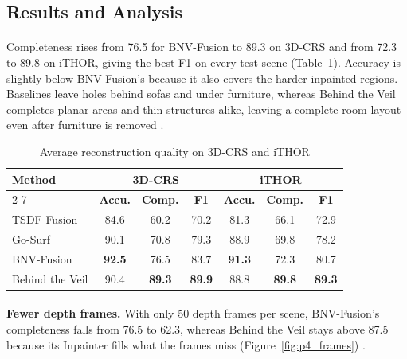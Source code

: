 \documentclass[12pt,a4paper,final]{extreport}
\begin{document}
\subsection{Results and Analysis}

\paragraph{} Completeness rises from 76.5 for BNV-Fusion to 89.3 on 3D-CRS and from 72.3 to 89.8 on iTHOR, giving the best F1 on every test scene (Table~\ref{tab:p4_main}). Accuracy is slightly below BNV-Fusion's because it also covers the harder inpainted regions. Baselines leave holes behind sofas and under furniture, whereas Behind the Veil completes planar areas and thin structures alike, leaving a complete room layout even after furniture is removed \cite{p4}.

{\renewcommand{\arraystretch}{1.12}
\begin{table}[htbp]
\centering
\caption{Average reconstruction quality on 3D-CRS and iTHOR}\label{tab:p4_main}
\small
\begin{tabular}{|l|c|c|c|c|c|c|}
\hline
\multirow{2}{*}{\textbf{Method}} & \multicolumn{3}{c|}{\textbf{3D-CRS}} & \multicolumn{3}{c|}{\textbf{iTHOR}} \\ \cline{2-7}
 & \textbf{Accu.} & \textbf{Comp.} & \textbf{F1} & \textbf{Accu.} & \textbf{Comp.} & \textbf{F1} \\ \hline
TSDF Fusion & 84.6 & 60.2 & 70.2 & 81.3 & 66.1 & 72.9 \\ \hline
Go-Surf & 90.1 & 70.8 & 79.3 & 88.9 & 69.8 & 78.2 \\ \hline
BNV-Fusion & \textbf{92.5} & 76.5 & 83.7 & \textbf{91.3} & 72.3 & 80.7 \\ \hline
Behind the Veil & 90.4 & \textbf{89.3} & \textbf{89.9} & 88.8 & \textbf{89.8} & \textbf{89.3} \\ \hline
\end{tabular}
\end{table}}

\paragraph{} \textbf{Fewer depth frames.} With only 50 depth frames per scene, BNV-Fusion's completeness falls from 76.5 to 62.3, whereas Behind the Veil stays above 87.5 because its Inpainter fills what the frames miss (Figure~\ref{fig:p4_frames}) \cite{p4}.
\end{document}
